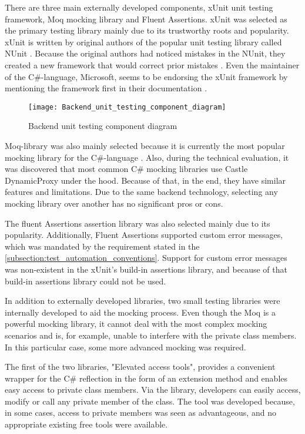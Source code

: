 There are three main externally developed components, xUnit unit testing framework, Moq mocking library and Fluent Assertions. xUnit was selected as the primary testing library mainly due to its trustworthy roots and popularity. xUnit is written by original authors of the popular unit testing library called NUnit \cite{xunit2022home}. Because the original authors had noticed mistakes in the NUnit, they created a new framework that would correct prior mistakes \cite{xunit2022why}. Even the maintainer of the C\#-language, Microsoft, seems to be endorsing the xUnit framework by mentioning the framework first in their documentation \cite{microsoft2022testing}.

\begin{figure}
	\centering
	\texttt{[image: Backend\_unit\_testing\_component\_diagram]}
	\caption{Backend unit testing component diagram}
	\label{fig:backend_unit_testing_component_diagram}
\end{figure}

Moq-library was also mainly selected because it is currently the most popular mocking library for the C\#-language \cite{moq2022repository}. Also, during the technical evaluation, it was discovered that most common C\# mocking libraries use Castle DynamicProxy under the hood. Because of that, in the end, they have similar features and limitations. Due to the same backend technology, selecting any mocking library over another has no significant pros or cons.

The fluent Assertions assertion library was also selected mainly due to its popularity. Additionally, Fluent Assertions supported custom error messages, which was mandated by the requirement stated in the \autoref{subsection:test_automation_conventions}. Support for custom error messages was non-existent in the xUnit's build-in assertions library, and because of that build-in assertions library could not be used.

In addition to externally developed libraries, two small testing libraries were internally developed to aid the mocking process. Even though the Moq is a powerful mocking library, it cannot deal with the most complex mocking scenarios and is, for example, unable to interfere with the private class members. In this particular case, some more advanced mocking was required.

The first of the two libraries, "Elevated access tools", provides a convenient wrapper for the C\# reflection in the form of an extension method and enables easy access to private class members. Via the library, developers can easily access, modify or call any private member of the class. The tool was developed because, in some cases, access to private members was seen as advantageous, and no appropriate existing free tools were available.

